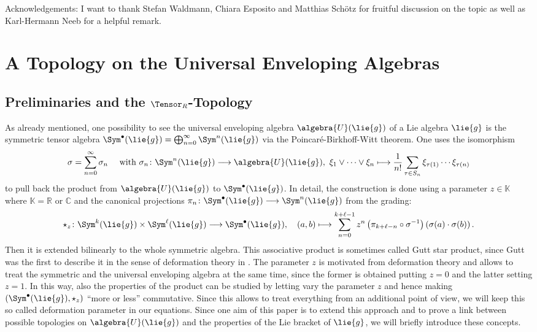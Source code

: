 \documentclass[
11pt,                          %
english                        %
]{article}
\begin{document}
Acknowledgements: I want to thank Stefan Waldmann, Chiara Esposito and Matthias 
Sch\"otz for fruitful discussion on the topic as well as Karl-Hermann Neeb for a 
helpful remark.


\section{A Topology on the Universal Enveloping Algebras}

\subsection{Preliminaries and the $\Tensor_R$-Topology}
As already mentioned, one possibility to see the universal enveloping algebra 
$\algebra{U}(\lie{g})$ of a Lie algebra $\lie{g}$ is the symmetric tensor algebra 
$\Sym^{\bullet}(\lie{g}) = \bigoplus_{n=0}^\infty \Sym^n(\lie{g})$ via the 
Poincar\'e-Birkhoff-Witt theorem. One uses the isomorphism
\begin{equation}
	\label{eq:pbw-isomorphism}
	\sigma
	=
	\sum\limits_{n=0}^\infty
	\sigma_n
	\quad \text{ with }
	\sigma_n
	\colon
	\Sym^n(\lie{g})
	\longrightarrow
	\algebra{U}(\lie{g})
	, \
	\xi_1 \vee \cdots \vee \xi_n
	\longmapsto
	\frac{1}{n!}
	\sum\limits_{\tau \in S_n}
	\xi_{\tau(1)} \cdots \xi_{\tau(n)}
\end{equation}
to pull back the product from $\algebra{U}(\lie{g})$ to $\Sym^{\bullet}(\lie{g})$. 
In detail, the construction is done using a parameter $z \in \mathbb{K}$ where 
$\mathbb{K} = \mathbb{R}$ or $\mathbb{C}$ and the canonical projections $\pi_n 
\colon \Sym^{\bullet}(\lie{g}) \longrightarrow \Sym^n(\lie{g})$ from the grading:
\begin{equation}
	\label{eq:starproduct}
	\star_z
	\colon
	\Sym^k(\lie{g})
	\times
	\Sym^\ell(\lie{g})
	\longrightarrow
	\Sym^{\bullet}(\lie{g})
	, \quad
	(a, b)
	\longmapsto
	\sum\limits_{n=0}^{k + \ell - 1}
	z^n
	\left( \pi_{k + \ell - n} \circ \sigma^{-1} \right)
	\left(
		\sigma(a)
		\cdot
		\sigma(b)
	\right).
\end{equation}
Then it is extended bilinearly to the whole symmetric algebra. This associative 
product is sometimes called Gutt star product, since Gutt was the first to describe 
it in the sense of deformation theory in \cite{gutt:1983a}.
The parameter $z$ is motivated from deformation theory and allows to treat the 
symmetric and the universal enveloping algebra at the same time, since the former is 
obtained putting $z = 0$ and the latter setting $z = 1$. In this way, also the 
properties of the product can be studied by letting vary the parameter $z$ and hence 
making $(\Sym^{\bullet}(\lie{g}), \star_z)$ ``more or less'' commutative. Since this 
allows to treat everything from an additional point of view, we will keep this so 
called deformation parameter in our equations. Since one aim of this paper is to 
extend this approach and to prove a link between possible topologies on $\algebra{U}
(\lie{g})$ and the properties of the Lie bracket of $\lie{g}$, we will briefly
introduce these concepts.
\end{document}

